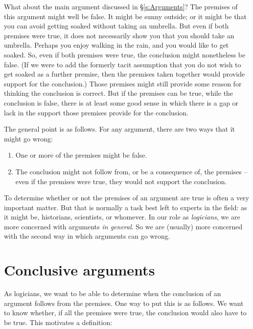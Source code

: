 What about the main argument discussed in §\ref{s:Arguments}? The premises of this argument might well be false. It might be sunny outside; or it might be that you can avoid getting soaked without taking an umbrella. But even if both premises were true, it does not necessarily show you that you should take an umbrella. Perhaps you enjoy walking in the rain, and you would like to get soaked. So, even if both premises were true, the conclusion might nonetheless be false. (If we were to add the formerly tacit assumption that you do not wish to get soaked as a further premise, then the premises taken together would provide support for the conclusion.) Those premises might still provide some reason for thinking the conclusion is correct. But if the premises can be true, while the conclusion is false, there is at least some good sense in which there is a gap or lack in the support those premises provide for the conclusion.

The general point is as follows. For any argument, there are two ways that it might go wrong:
	\begin{enumerate}
		\item One or more of the premises might be false. 
		\item The conclusion might not follow from, or be a consequence of, the premises – even if the premises were true, they would not support the conclusion. 
	\end{enumerate}
To determine whether or not the premises of an argument are true is often a very important matter. But that is normally a task best left to experts in the field: as it might be, historians, scientists, or whomever. In our role as \emph{logicians}, we are more concerned with arguments \emph{in general}. So we are (usually) more concerned with the second way in which arguments can go wrong.


\section{Conclusive arguments} \label{s:conclusiveargs}
As logicians, we want to be able to determine when the conclusion of an argument follows from the premises. One way to put this is as follows. We want to know whether, if all the premises were true, the conclusion would also have to be true. This motivates a definition:



